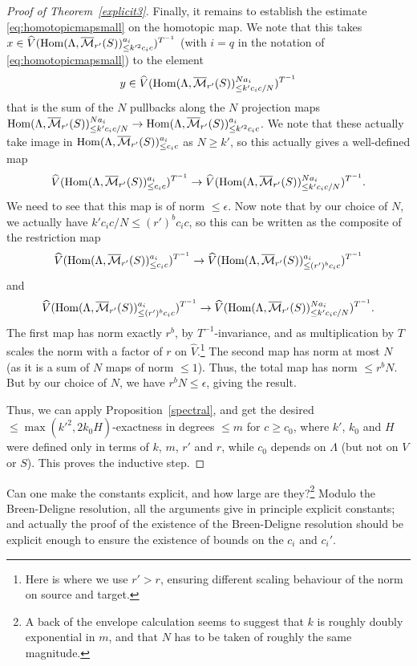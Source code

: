 \begin{proof}[Proof of Theorem~\ref{explicit3}]
Finally, it remains to establish the estimate \eqref{eq:homotopicmapsmall} on the homotopic map. We note that this takes $x\in \widehat{V}(\operatorname{Hom}(\Lambda,\overline{\mathcal M}_{r'}(S))_{\leq k'^2c_ic}^{a_i})^{T^{-1}}$ (with $i=q$ in the notation of \eqref{eq:homotopicmapsmall}) to the element
\[
y\in \widehat{V}(\operatorname{Hom}(\Lambda,\overline{\mathcal M}_{r'}(S))_{\leq k'c_ic/N}^{Na_i})^{T^{-1}}
\]
that is the sum of the $N$ pullbacks along the $N$ projection maps $\operatorname{Hom}(\Lambda,\overline{\mathcal M}_{r'}(S))_{\leq k'c_ic/N}^{Na_i}\to \operatorname{Hom}(\Lambda,\overline{\mathcal M}_{r'}(S))_{\leq k'^2c_ic}^{a_i}$. We note that these actually take image in $\operatorname{Hom}(\Lambda,\overline{\mathcal M}_{r'}(S))_{\leq c_ic}^{a_i}$ as $N\geq k'$, so this actually gives a well-defined map
\[
\widehat{V}(\operatorname{Hom}(\Lambda,\overline{\mathcal M}_{r'}(S))_{\leq c_ic}^{a_i})^{T^{-1}}\to \widehat{V}(\operatorname{Hom}(\Lambda,\overline{\mathcal M}_{r'}(S))_{\leq k'c_ic/N}^{Na_i})^{T^{-1}}.
\]
We need to see that this map is of norm $\leq \epsilon$. Now note that by our choice of $N$, we actually have $k'c_ic/N\leq (r')^b c_ic$, so this can be written as the composite of the restriction map
\[
\widehat{V}(\operatorname{Hom}(\Lambda,\overline{\mathcal M}_{r'}(S))_{\leq c_ic}^{a_i})^{T^{-1}}\to \widehat{V}(\operatorname{Hom}(\Lambda,\overline{\mathcal M}_{r'}(S))_{\leq (r')^b c_ic}^{a_i})^{T^{-1}}
\]
and
\[
\widehat{V}(\operatorname{Hom}(\Lambda,\overline{\mathcal M}_{r'}(S))_{\leq (r')^b c_ic}^{a_i})^{T^{-1}}\to \widehat{V}(\operatorname{Hom}(\Lambda,\overline{\mathcal M}_{r'}(S))_{\leq k'c_ic/N}^{Na_i})^{T^{-1}}.
\]
The first map has norm exactly $r^b$, by $T^{-1}$-invariance, and as multiplication by $T$ scales the norm with a factor of $r$ on $\widehat{V}$.\footnote{Here is where we use $r'>r$, ensuring different scaling behaviour of the norm on source and target.} The second map has norm at most $N$ (as it is a sum of $N$ maps of norm $\leq 1$). Thus, the total map has norm $\leq r^bN$. But by our choice of $N$, we have $r^bN\leq \epsilon$, giving the result.

Thus, we can apply Proposition~\ref{spectral}, and get the desired $\leq \max(k'^2,2k_0H)$-exactness in degrees $\leq m$ for $c\geq c_0$, where $k'$, $k_0$ and $H$ were defined only in terms of $k$, $m$, $r'$ and $r$, while $c_0$ depends on $\Lambda$ (but not on $V$ or $S$). This proves the inductive step.
\end{proof}

\begin{question} Can one make the constants explicit, and how large are they?\footnote{A back of the envelope calculation seems to suggest that $k$ is roughly doubly exponential in $m$, and that $N$ has to be taken of roughly the same magnitude.} Modulo the Breen-Deligne resolution, all the arguments give in principle explicit constants; and actually the proof of the existence of the Breen-Deligne resolution should be explicit enough to ensure the existence of bounds on the $c_i$ and $c_i'$.
\end{question}

